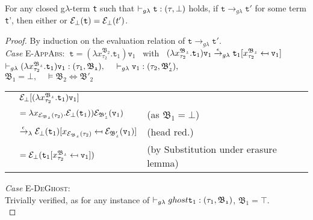 \theoremstyle{remark}
\begin{lemma}
	For any closed g$\lambda$-term \texttt{t} such that
	$\vdash_{g\lambda} \texttt{t} : (\tau, \bot)$ holds, 
	if	$\texttt{t} \rightarrow_{g\lambda} \texttt{t}'$ for some term \texttt{t}', then either 
	 or $\mathcal{E}_{\bot}(\texttt{t}) = \mathcal{E}_{\bot}(t')$. 
\end{lemma}
\begin{proof} By induction on the evaluation relation of $\texttt{t} \rightarrow_{g\lambda} \texttt{t}'$. \\

\noindent\textit{Case} \textsc{E-AppAbs}: \qquad
$~\texttt{t} = (\lambda x^{\mathfrak{B_{2}}}_{\tau_{2}}.\texttt{t}_{1})\texttt{v}_{1}$ ~with~
$(\lambda x^{\mathfrak{B_{2}}}_{\tau_{2}}.\texttt{t}_{1})\texttt{v}_{1} 
\stackrel{\epsilon\quad}{\rightarrow_{g\lambda}}  \texttt{t}_{1} [x^{\mathfrak{B_{2}}}_{\tau_{2}} \mapsfrom \texttt{v}_{1}]$\\
 $\vdash_{g\lambda} (\lambda x^{\mathfrak{B_{2}}}_{\tau_{2}}.\texttt{t}_{1})\texttt{v}_{1} : (\tau_{1}, \mathfrak{B_{1}}), \quad$
$\vdash_{g\lambda} \texttt{v}_{1} : (\tau_{2}, \mathfrak{B'_{2}}), $ \\
$ \mathfrak{B_{1}} = \bot,  \quad 
\vDash\mathfrak{B_{2}} \Leftrightarrow \mathfrak{B'_{2}} $ 
\begin{center}
\begin{tabular}{lll}
   & $\mathcal{E}_{\bot}[(\lambda x^{\mathfrak{B_{2}}}_{\tau_{2}}.\texttt{t}_{1})\texttt{v}_{1}]$ &\\
   & $ = \lambda x_{\mathcal{E}_{\mathfrak{B_{2}}}(\tau_{2})}. \mathcal{E}_{\bot}(\texttt{t}_{1}))\mathcal{E}_{\mathfrak{B'_{2}}}(\texttt{v}_{1})$ 
   & (as $ \mathfrak{B_{1}} = \bot $)  \\
   &  $ \stackrel{\epsilon~~}{\rightarrow_{\lambda}} 
   \mathcal{E}_{\bot}(\texttt{t}_{1}) [x_{\mathcal{E}_{\mathfrak{B_{2}}}(\tau_{2})} \mapsfrom \mathcal{E}_{\mathfrak{B'_{2}}}(\texttt{v}_{1})]$ & (head red.) \\
   & $ = \mathcal{E}_{\bot}(\texttt{t}_{1} [x^{\mathfrak{B_{2}}}_{\tau_{2}} \mapsfrom \texttt{v}_{1}]) $ 
   & (by Substitution under erasure lemma)

 \end{tabular}
  \end{center}

\noindent\textit{Case} \textsc{E-DeGhost}:  \qquad \\ Trivially verified,
as for any instance of $\vdash_{g\lambda} ghost \texttt{t}_{1} : (\tau_{1}, \mathfrak{B_{1}})$, $\mathfrak{B_{1}} = \top $.\\


\end{proof}
